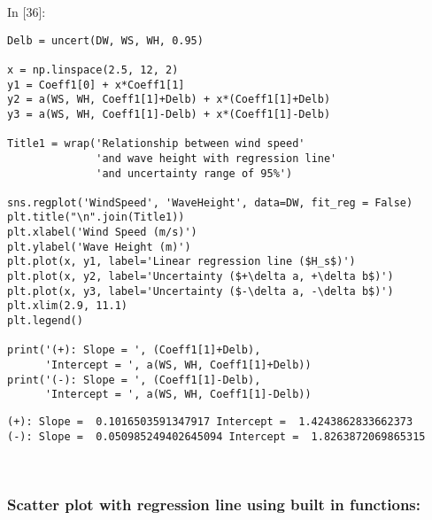 \documentclass[11pt]{article}
\newif\ifcode
\newif\ifleftmargins
\newlength{\promptlength}
\newcommand{\prompt}[3]{
        \needspace{1.1cm}
        \settowidth{\promptlength}{ #1 [#3] }
        \ifleftmargins\hspace{-\promptlength}\hspace{-5pt}\fi
        {\color{#2}#1 [#3]:}
        \ifleftmargins\vspace{-2.7ex}\fi
    }
\begin{document}
    
\prompt{In}{incolor}{36}
\codetrue
\begin{tcolorbox}[breakable, size=fbox, boxrule=1pt, pad at break*=1mm, colback=cellbackground, colframe=cellborder]
\begin{verbatim}
Delb = uncert(DW, WS, WH, 0.95)

x = np.linspace(2.5, 12, 2)
y1 = Coeff1[0] + x*Coeff1[1]
y2 = a(WS, WH, Coeff1[1]+Delb) + x*(Coeff1[1]+Delb) 
y3 = a(WS, WH, Coeff1[1]-Delb) + x*(Coeff1[1]-Delb) 

Title1 = wrap('Relationship between wind speed' 
              'and wave height with regression line'
              'and uncertainty range of 95%')

sns.regplot('WindSpeed', 'WaveHeight', data=DW, fit_reg = False)
plt.title("\n".join(Title1))
plt.xlabel('Wind Speed (m/s)')
plt.ylabel('Wave Height (m)')
plt.plot(x, y1, label='Linear regression line ($H_s$)')
plt.plot(x, y2, label='Uncertainty ($+\delta a, +\delta b$)')
plt.plot(x, y3, label='Uncertainty ($-\delta a, -\delta b$)')
plt.xlim(2.9, 11.1)
plt.legend()

print('(+): Slope = ', (Coeff1[1]+Delb), 
      'Intercept = ', a(WS, WH, Coeff1[1]+Delb))
print('(-): Slope = ', (Coeff1[1]-Delb), 
      'Intercept = ', a(WS, WH, Coeff1[1]-Delb))
\end{verbatim}
\end{tcolorbox}
\codefalse

    \begin{Verbatim}[commandchars=\\\{\}]
(+): Slope =  0.1016503591347917 Intercept =  1.4243862833662373
(-): Slope =  0.050985249402645094 Intercept =  1.8263872069865315

    \end{Verbatim}

    \begin{center}
    \end{center}
    { \hspace*{\fill} \\}
    
    \hypertarget{scatter-plot-with-regression-line-using-built-in-functions}{%
\subsubsection{Scatter plot with regression line using built in
functions:}\label{scatter-plot-with-regression-line-using-built-in-functions}}
\end{document}

